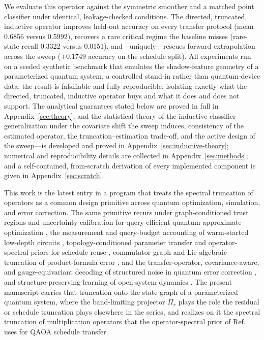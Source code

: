 \documentclass[aps,prresearch,reprint,amsmath,amssymb,nofootinbib,superscriptaddress,floatfix]{revtex4-2}
\theoremstyle{definition}
\theoremstyle{remark}
\theoremstyle{plain}
\begin{document}
We evaluate this operator against the symmetric smoother and a matched point classifier under identical,
leakage-checked conditions. The directed, truncated, inductive operator improves held-out accuracy on every
transfer protocol (mean \num{0.6856} versus \num{0.5992}), recovers a rare critical regime the baseline
misses (rare-state recall \num{0.3322} versus \num{0.0151}), and---uniquely---rescues forward
extrapolation across the sweep ($+\num{0.1749}$ accuracy on the schedule split). All experiments run on a seeded synthetic benchmark that emulates the
shadow-feature geometry of a parameterized quantum system, a controlled stand-in rather than
quantum-device data; the result is falsifiable and fully reproducible, isolating exactly what the directed,
truncated, inductive operator buys and what it does and does not support. The analytical guarantees stated
below are proved in full in
Appendix~\ref{sec:theory}, and the statistical theory of the inductive classifier---generalization under the
covariate shift the sweep induces, consistency of the estimated operator, the truncation--estimation
trade-off, and the active design of the sweep---is developed and proved in
Appendix~\ref{sec:inductive-theory}; numerical and reproducibility details are collected in
Appendix~\ref{sec:methods}; and a self-contained, from-scratch derivation of every implemented component is
given in Appendix~\ref{sec:scratch}.

This work is the latest entry in a program that treats the spectral truncation of operators as a common
design primitive across quantum optimization, simulation, and error correction. The same primitive recurs
under graph-conditioned trust regions and uncertainty calibration for query-efficient quantum approximate
optimization \cite{huynh2026gctr,huynh2026gctrcalpro}, the measurement and query-budget
accounting of warm-started low-depth circuits \cite{huynh2026meascost,huynh2026certqb}, topology-conditioned
parameter transfer and operator-spectral priors for schedule reuse
\cite{huynh2026paramxferB,huynh2026ostqaoa,huynh2026topoqaoa}, commutator-graph and
Lie-algebraic truncation of product-formula error \cite{huynh2026topoham,huynh2026lie}, and the
transfer-operator, covariance-aware, and gauge-equivariant decoding of structured noise in quantum error
correction \cite{huynh2026gnndec,huynh2026topoqec,huynh2026covdec,huynh2026fiber}, and
structure-preserving learning of open-system dynamics \cite{huynh2026cptppinn}. The present manuscript
carries that truncation onto the state graph of a parameterized quantum system, where the band-limiting
projector $\Pi_r$ plays the role the residual or schedule truncation plays elsewhere in the series, and
realizes on it the spectral truncation of multiplication operators that the
operator-spectral prior of Ref.~\cite{huynh2026ostqaoa} uses for QAOA schedule transfer.
\end{document}
